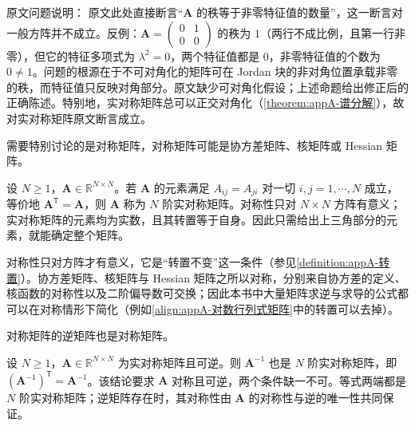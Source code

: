 \documentclass[../main.tex]{subfiles}
\begin{document}
\begin{remark}
原文问题说明：
原文此处直接断言“$\bm{A}$ 的秩等于非零特征值的数量”，这一断言对一般方阵并不成立。反例：$\bm{A}=\begin{pmatrix}0&1\\0&0\end{pmatrix}$ 的秩为 $1$（两行不成比例，且第一行非零），但它的特征多项式为 $\lambda^{2}=0$，两个特征值都是 $0$，非零特征值的个数为 $0\neq1$。问题的根源在于不可对角化的矩阵可在 Jordan 块的非对角位置承载非零的秩，而特征值只反映对角部分。原文缺少可对角化假设；上述命题给出修正后的正确陈述。特别地，实对称矩阵总可以正交对角化（\cref{theorem:appA-谱分解}），故对实对称矩阵原文断言成立。
\end{remark}

需要特别讨论的是对称矩阵，对称矩阵可能是协方差矩阵、核矩阵或 Hessian 矩阵。

\begin{definition}[对称矩阵]\label{definition:appA-对称矩阵}
设 $N\geqslant1$，$\bm{A}\in\mathbb{R}^{N\times N}$。若 $\bm{A}$ 的元素满足 $A_{ij}=A_{ji}$ 对一切 $i,j=1,\cdots,N$ 成立，等价地 $\bm{A}^{\mathsf{T}}=\bm{A}$，则 $\bm{A}$ 称为 $N$ 阶实对称矩阵。对称性只对 $N\times N$ 方阵有意义；实对称矩阵的元素均为实数，且其转置等于自身。因此只需给出上三角部分的元素，就能确定整个矩阵。
\end{definition}

\begin{remark}
对称性只对方阵才有意义，它是“转置不变”这一条件（参见\cref{definition:appA-转置}）。协方差矩阵、核矩阵与 Hessian 矩阵之所以对称，分别来自协方差的定义、核函数的对称性以及二阶偏导数可交换；因此本书中大量矩阵求逆与求导的公式都可以在对称情形下简化（例如\eqref{align:appA-对数行列式矩阵}中的转置可以去掉）。
\end{remark}

对称矩阵的逆矩阵也是对称矩阵。

\begin{proposition}[对称矩阵的逆]\label{proposition:appA-对称矩阵的逆}
设 $N\geqslant1$，$\bm{A}\in\mathbb{R}^{N\times N}$ 为实对称矩阵且可逆。则 $\bm{A}^{-1}$ 也是 $N$ 阶实对称矩阵，即 $(\bm{A}^{-1})^{\mathsf{T}}=\bm{A}^{-1}$。该结论要求 $\bm{A}$ 对称且可逆，两个条件缺一不可。等式两端都是 $N$ 阶实对称矩阵；逆矩阵存在时，其对称性由 $\bm{A}$ 的对称性与逆的唯一性共同保证。
\end{proposition}
\end{document}
